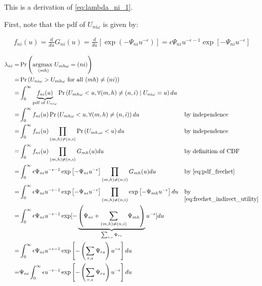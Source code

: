 \documentclass[10pt]{article}
\begin{document}
This is a derivation of \eqref{eq:lambda_ni_1}.

First, note that the pdf of $U_{n i \omega}$ is given by:

\begin{align}
    f_{n i}(u)=\frac{d}{d u} G_{n i}(u)= \frac{d}{d u}\left[\exp \left(-\Psi_{n i} u^{-\epsilon}\right)\right]
    =\epsilon \Psi_{n i} u^{-\epsilon-1} \exp \left[-\Psi_{n i} u^{-\epsilon}\right] \label{eq:pdf_frechet}
\end{align}

\begin{align}
    \lambda_{ni} = &\Pr\left( \underset{(mh)}{\text{argmax }} U_{m h \omega} = (ni) \right) \\
    = &\Pr\left( U_{n i \omega} > U_{m h \omega} \text{ for all } (m h) \neq (n i) \right) \\
    = & \int_0^{\infty} \underbrace{f_{n i}(u)}_{\text {pdf of } U_{n i \omega}} \operatorname{Pr}\left(U_{m h \omega}<u, \forall(m, h) \neq(n, i) \mid U_{n i \omega}=u\right) d u \\
    = & \int_0^{\infty} f_{n i}(u) \operatorname{Pr}\left(U_{m h \omega}<u, \forall(m, h) \neq(n, i) \right) d u && \parbox[t]{4cm}{\raggedright by independence} \\
    = & \int_0^{\infty} f_{n i}(u) \prod_{(m, h) \neq(n, i)} \operatorname{Pr}\left(U_{m h, \omega}<u\right) d u && \parbox[t]{4cm}{\raggedright by independence} \\
    = & \int_0^{\infty} f_{n i}(u) \prod_{(m, h) \neq(n, i)} G_{m h}(u) d u && \parbox[t]{4cm}{\raggedright by definition of CDF} \\
    = & \int_0^{\infty} \epsilon \Psi_{n i} u^{-\epsilon-1} \exp \left[-\Psi_{n i} u^{-\epsilon}\right] \prod_{(m, h) \neq(n, i)} G_{m h}(u) d u && \parbox[t]{4cm}{\raggedright by \eqref{eq:pdf_frechet}} \\
    = & \int_0^{\infty} \epsilon \Psi_{n i} u^{-\epsilon-1} \exp \left[-\Psi_{n i} u^{-\epsilon}\right] \prod_{(m, h) \neq(n, i)} \exp \left[-\Psi_{m h} u^{-\epsilon}\right] d u && \parbox[t]{4cm}{\raggedright by \eqref{eq:frechet_indirect_utility}} \\
    = &\int_0^{\infty} \epsilon \Psi_{n i} u^{-\epsilon-1} \exp [-\underbrace{\left(\Psi_{n i}+\sum_{(m, h) \neq(n, i)} \Psi_{m h}\right)}_{\sum_{r, s} \Psi_{r s}} u^{-\epsilon}] d u \\
    = &\int_0^{\infty} \epsilon \Psi_{n i} u^{-\epsilon-1} \exp \left[-\left(\sum_{r, s} \Psi_{r s}\right) u^{-\epsilon}\right] d u \\
    = &\Psi_{n i} \int_0^{\infty} \epsilon u^{-\epsilon-1} \exp \left[-\left(\sum_{r, s} \Psi_{r s}\right) u^{-\epsilon}\right] d u
\end{align}
\end{document}
